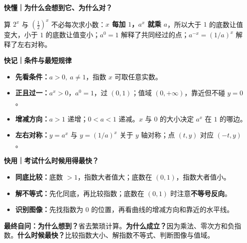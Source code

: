 \clearpage
\begin{summarybox}

\textbf{\textcolor{CSummary}{快懂｜为什么会想到它、为什么对？}}

算 $2^x$ 与 $(\frac12)^x$ 不必每次求小数：\textbf{$x$ 每加 $1$，$a^x$ 就乘 $a$}，所以大于 $1$ 的底数让值变大，小于 $1$ 的底数让值变小；$a^0=1$ 解释了共同经过的点；$a^{-x}=(1/a)^x$ 解释了左右对称。

\medskip
\textbf{\textcolor{CSummary}{快记｜条件与最短规律}}
\begin{itemize}[leftmargin=*,itemsep=0.32em,topsep=0.3em]
  \item \textbf{先看条件：}$a>0,\ a\neq1$，指数 $x$ 可取任意实数。
  \item \textbf{正且过一：}$a^x>0$，$a^0=1$，过 $(0,1)$；值域 $(0,+\infty)$，靠近但不碰 $y=0$。
  \item \textbf{增减方向：}$a>1$ 递增；$0<a<1$ 递减。$x$ 与 $0$ 的大小决定 $a^x$ 在 $1$ 的哪边。
  \item \textbf{左右对称：}$y=a^x$ 与 $y=(1/a)^x$ 关于 $y$ 轴对称；点 $(t,y)$ 对应 $(-t,y)$。
\end{itemize}

\medskip
\textbf{\textcolor{CSummary}{快用｜考试什么时候用得最快？}}
\begin{itemize}[leftmargin=*,itemsep=0.32em,topsep=0.3em]
  \item \textbf{同底比较：}底数 $>1$，指数大者值大；底数在 $(0,1)$，指数大者值小。
  \item \textbf{解不等式：}先化同底，再比较指数；底数在 $(0,1)$ 时注意\textbf{不等号反向}。
  \item \textbf{识别图像：}先找指数为 $0$ 的位置，再看曲线的增减方向和靠近的水平线。
\end{itemize}

\textbf{\textcolor{CSummary}{最终自问：}}\textbf{为什么想到？}省去繁琐计算。\textbf{为什么成立？}因为乘法、零次方和负指数。\textbf{什么时候最快？}比较指数大小、解指数不等式、判断图像与值域。

\end{summarybox}
